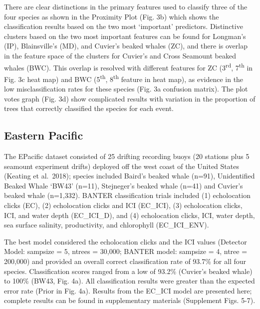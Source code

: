 \documentclass[
  letterpaper,
  DIV=11,
  numbers=noendperiod]{scrartcl}
\begin{document}
There are clear distinctions in the primary features used to classify
three of the four species as shown in the Proximity Plot (Fig. 3b) which
shows the classification results based on the two most `important'
predictors. Distinctive clusters based on the two most important
features can be found for Longman's (IP), Blainsville's (MD), and
Cuvier's beaked whales (ZC), and there is overlap in the feature space
of the clusters for Cuvier's and Cross Seamount beaked whales (BWC).
This overlap is resolved with different features for ZC
(3\textsuperscript{rd}, 7\textsuperscript{th} in Fig. 3c heat map) and
BWC (5\textsuperscript{th}, 8\textsuperscript{th} feature in heat map),
as evidence in the low misclassification rates for these species (Fig.
3a confusion matrix). The plot votes graph (Fig. 3d) show complicated
results with variation in the proportion of trees that correctly
classified the species for each event.

\hypertarget{eastern-pacific}{%
\subsection{Eastern Pacific}\label{eastern-pacific}}

The EPacific dataset consisted of 25 drifting recording buoys (20
stations plus 5 seamount experiment drifts) deployed off the west coast
of the United States (Keating et al.~2018); species included Baird's
beaked whale (n=91), Unidentified Beaked Whale `BW43' (n=11),
Stejneger's beaked whale (n=41) and Cuvier's beaked whale (n=1,332).
BANTER classification trials included (1) echolocation clicks (EC), (2)
echolocation clicks and ICI (EC\_ICI), (3) echolocation clicks, ICI, and
water depth (EC\_ICI\_D), and (4) echolocation clicks, ICI, water depth,
sea surface salinity, productivity, and chlorophyll (EC\_ICI\_ENV).

The best model considered the echolocation clicks and the ICI values
(Detector Model: sampsize = 5, ntrees = 30,000; BANTER model: sampsize =
4, ntree = 200,000) and provided an overall correct classification rate
of 93.7\% for all four species. Classification scores ranged from a low
of 93.2\% (Cuvier's beaked whale) to 100\% (BW43, Fig. 4a). All
classification results were greater than the expected error rate (Prior
in Fig. 4a). Results from the EC\_ICI model are presented here; complete
results can be found in supplementary materials (Supplement Figs. 5-7).
\end{document}
